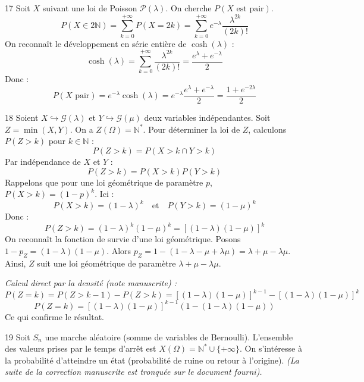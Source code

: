 \begin{correction}{17}
Soit $X$ suivant une loi de Poisson $\mathcal{P}(\lambda)$. On cherche $P(X \text{ est pair})$.
$$ P(X \in 2\mathbb{N}) = \sum_{k=0}^{+\infty} P(X=2k) = \sum_{k=0}^{+\infty} e^{-\lambda} \frac{\lambda^{2k}}{(2k)!} $$
On reconnaît le développement en série entière de $\cosh(\lambda)$ :
$$ \cosh(\lambda) = \sum_{k=0}^{+\infty} \frac{\lambda^{2k}}{(2k)!} = \frac{e^\lambda + e^{-\lambda}}{2} $$
Donc :
$$ P(X \text{ pair}) = e^{-\lambda} \cosh(\lambda) = e^{-\lambda} \frac{e^\lambda + e^{-\lambda}}{2} = \frac{1 + e^{-2\lambda}}{2} $$
\end{correction}

\begin{correction}{18}
Soient $X \hookrightarrow \mathcal{G}(\lambda)$ et $Y \hookrightarrow \mathcal{G}(\mu)$ deux variables indépendantes.
Soit $Z = \min(X, Y)$. On a $Z(\Omega) = \mathbb{N}^*$.
Pour déterminer la loi de $Z$, calculons $P(Z > k)$ pour $k \in \mathbb{N}$ :
$$ P(Z > k) = P(X > k \cap Y > k) $$
Par indépendance de $X$ et $Y$ :
$$ P(Z > k) = P(X > k) P(Y > k) $$
Rappelons que pour une loi géométrique de paramètre $p$, $P(X > k) = (1-p)^k$. Ici :
$$ P(X > k) = (1-\lambda)^k \quad \text{et} \quad P(Y > k) = (1-\mu)^k $$
Donc :
$$ P(Z > k) = (1-\lambda)^k (1-\mu)^k = \left[ (1-\lambda)(1-\mu) \right]^k $$
On reconnaît la fonction de survie d'une loi géométrique. Posons $1 - p_{Z} = (1-\lambda)(1-\mu)$.
Alors $p_Z = 1 - (1 - \lambda - \mu + \lambda\mu) = \lambda + \mu - \lambda\mu$.
Ainsi, $Z$ suit une loi géométrique de paramètre $\lambda + \mu - \lambda\mu$.

\textit{Calcul direct par la densité (note manuscrite) :}
$$ P(Z=k) = P(Z > k-1) - P(Z > k) = [(1-\lambda)(1-\mu)]^{k-1} - [(1-\lambda)(1-\mu)]^k $$
$$ P(Z=k) = [(1-\lambda)(1-\mu)]^{k-1} (1 - (1-\lambda)(1-\mu)) $$
Ce qui confirme le résultat.
\end{correction}

\begin{correction}{19}
Soit $S_n$ une marche aléatoire (somme de variables de Bernoulli).
L'ensemble des valeurs prises par le temps d'arrêt est $X(\Omega) = \mathbb{N}^* \cup \{+\infty\}$.
On s'intéresse à la probabilité d'atteindre un état (probabilité de ruine ou retour à l'origine).
\textit{(La suite de la correction manuscrite est tronquée sur le document fourni).}
\end{correction}


